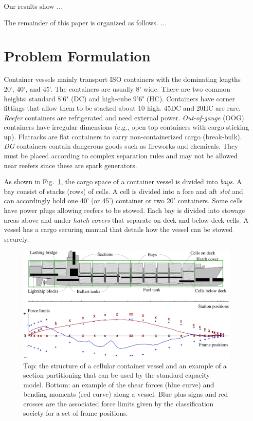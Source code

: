 \documentclass[runningheads]{llncs}
\begin{document}
Our results show ...

The remainder of this paper is organized as follows. ...

\section{Problem Formulation}

Container vessels mainly transport ISO containers with the dominating lengths 20', 40', and 45'. The containers are usually 8' wide. There are two common heights: standard 8'6" (DC) and high-cube 9'6" (HC). Containers have corner fittings that allow them to be stacked about 10 high. 45DC and 20HC are rare. {\em Reefer} containers are refrigerated and need external power. {\em Out-of-gauge} (OOG) containers have irregular dimensions (e.g., open top containers with cargo sticking up). Flatracks are flat containers to carry non-containerized cargo (break-bulk). {\em DG} containers contain dangerous goods such as fireworks and chemicals. They must be placed according to complex separation rules and may not be allowed near reefers since these are spark generators. 

As shown in Fig.~\ref{fig:vessel}, the cargo space of a container vessel is divided into {\em bays}. A bay consist of stacks (rows) of cells. A cell is divided into a fore and aft \emph{slot} and can accordingly hold one 40' (or 45') container or two 20' containers. Some cells have power plugs allowing reefers to be stowed. Each bay is divided into stowage areas above and under {\em hatch covers} that separate on deck and below deck cells. A vessel has a cargo securing manual that details how the vessel can be stowed securely.    
\begin{figure}[h!]
	\centering
		\includegraphics[scale=0.24]{figures/vesselAndForces.pdf}
	\caption{Top: the structure of a cellular container vessel and an example of a section partitioning that can be used by the standard capacity model. Bottom: an example of the shear forces (blue curve) and bending moments (red curve) along a vessel. Blue plus signs and red crosses are the associated force limits given by the classification society for a set of frame positions.} 
	\label{fig:vessel}
\end{figure}
\end{document}
